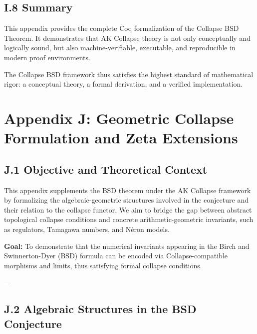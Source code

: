 \documentclass[11pt]{article}
\begin{document}
\subsection*{I.8 Summary}

This appendix provides the complete Coq formalization of the Collapse BSD Theorem.  
It demonstrates that AK Collapse theory is not only conceptually and logically sound, but also machine-verifiable, executable, and reproducible in modern proof environments.

The Collapse BSD framework thus satisfies the highest standard of mathematical rigor:  
a conceptual theory, a formal derivation, and a verified implementation.




\section*{Appendix J: Geometric Collapse Formulation and Zeta Extensions}

\subsection*{J.1 Objective and Theoretical Context}

This appendix supplements the BSD theorem under the AK Collapse framework by formalizing the algebraic-geometric structures involved in the conjecture and their relation to the collapse functor. We aim to bridge the gap between abstract topological collapse conditions and concrete arithmetic-geometric invariants, such as regulators, Tamagawa numbers, and Néron models.

\begin{center}
\textbf{Goal:} To demonstrate that the numerical invariants appearing in the Birch and Swinnerton-Dyer (BSD) formula can be encoded via Collapse-compatible morphisms and limits, thus satisfying formal collapse conditions.
\end{center}

---

\subsection*{J.2 Algebraic Structures in the BSD Conjecture}
\end{document}
